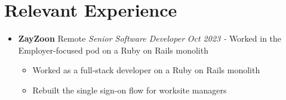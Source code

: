\documentclass[letterpaper,11pt]{article}
\newcommand{\resumeSubHeading}[4]{
	\item[]
      \textbf{#1} \hfill #2 \newline
      \textit{#3} \hfill \textit{#4}
}
\begin{document}
\section{Relevant Experience}
  \begin{itemize}[leftmargin=*]

    \resumeSubHeading
      {ZayZoon}{Remote}
      {Senior Software Developer}{Oct 2023 -}\newline
      Worked in the Employer-focused pod on a Ruby on Rails monolith
      \begin{itemize}[noitemsep,topsep=0pt]
        \item Worked as a full-stack developer on a Ruby on Rails monolith
        \item Rebuilt the single sign-on flow for worksite managers
      \end{itemize}


\end{itemize}
\end{document}
